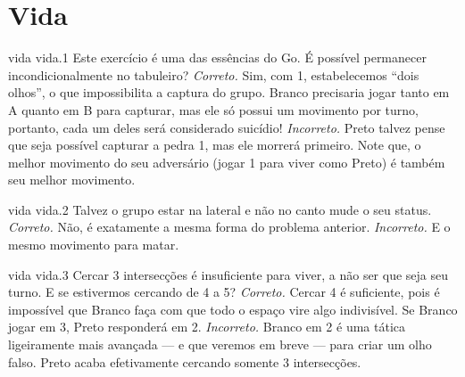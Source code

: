 \chapter{Vida}

\emptypage

\problemAnswerDiagram
  {vida}
  {vida.1}
  {Este exercício é uma das essências do Go. É possível permanecer incondicionalmente no tabuleiro?}
  {\emph{Correto.} Sim, com 1, estabelecemos ``dois olhos'', o que impossibilita a captura do grupo. Branco precisaria jogar tanto em A quanto em B para capturar, mas ele só possui um movimento por turno, portanto, cada um deles será considerado suicídio!}
  {\emph{Incorreto.} Preto talvez pense que seja possível capturar a pedra 1, mas ele morrerá primeiro. Note que, o melhor movimento do seu adversário (jogar 1 para viver como Preto) é também seu melhor movimento.}

\problemAnswerDiagram
  {vida}
  {vida.2}
  {Talvez o grupo estar na lateral e não no canto mude o seu status.}
  {\emph{Correto.} Não, é exatamente a mesma forma do problema anterior.}
  {\emph{Incorreto.} E o mesmo movimento para matar.}

\problemAnswerDiagram
  {vida}
  {vida.3}
  {Cercar 3 intersecções é insuficiente para viver, a não ser que seja seu turno. E se estivermos cercando de 4 a 5?}
  {\emph{Correto.} Cercar 4 é suficiente, pois é impossível que Branco faça com que todo o espaço vire algo indivisível. Se Branco jogar em 3, Preto responderá em 2.}
  {\emph{Incorreto.} Branco em 2 é uma tática ligeiramente mais avançada --- e que veremos em breve --- para criar um olho falso. Preto acaba efetivamente cercando somente 3 intersecções.}